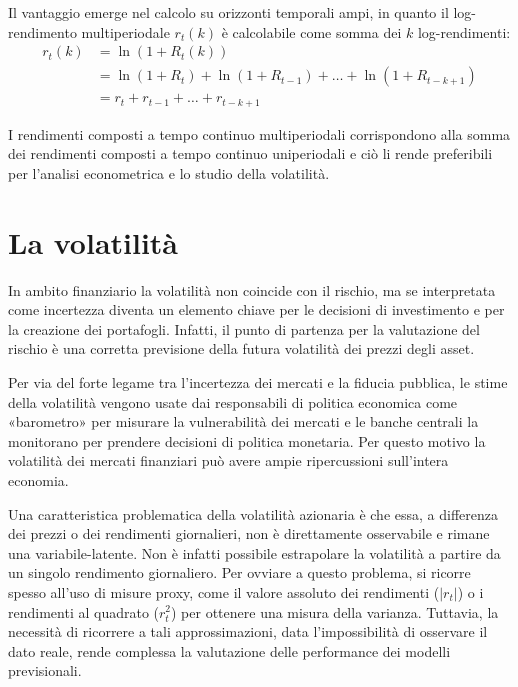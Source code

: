 Il vantaggio emerge nel calcolo su orizzonti temporali ampi, in quanto il log-rendimento multiperiodale $r_t(k)$ è calcolabile come somma dei $k$ log-rendimenti:
\begin{align*}
    r_t(k) &= \ln(1 + R_t(k)) \\
           &= \ln(1 + R_t) + \ln(1 + R_{t-1}) + \dots + \ln(1 + R_{t-k+1}) \\
           &= r_t + r_{t-1} + \dots + r_{t-k+1}
\end{align*}

I rendimenti composti a tempo continuo multiperiodali corrispondono alla somma dei rendimenti composti a tempo continuo uniperiodali e ciò li rende preferibili per l'analisi econometrica e lo studio della volatilità.


\section{La volatilità}
\label{sec:volatilita}
In ambito finanziario la volatilità non coincide con il rischio, ma se interpretata come incertezza diventa un elemento chiave per le decisioni 
di investimento e per la creazione dei portafogli\cite{poon:forecasting}. Infatti, il punto di partenza per la valutazione del rischio 
è una corretta previsione della futura volatilità dei prezzi degli asset.

Per via del forte legame tra l'incertezza dei mercati e la fiducia pubblica, le stime della volatilità vengono usate dai responsabili di 
politica economica come «barometro» per misurare la vulnerabilità dei mercati e le banche centrali la monitorano per prendere decisioni 
di politica monetaria. Per questo motivo la volatilità dei mercati finanziari può avere ampie ripercussioni sull'intera economia.

Una caratteristica problematica della volatilità azionaria è che essa, a differenza dei prezzi o dei rendimenti giornalieri, non è direttamente osservabile e rimane una \gls{variabile-latente}\cite{tsay:analysis}.
Non è infatti possibile estrapolare la volatilità a partire da un singolo rendimento giornaliero.
Per ovviare a questo problema, si ricorre spesso all'uso di misure \gls{proxy}, come il valore assoluto dei rendimenti ($|r_t|$) o i rendimenti al quadrato ($r_t^2$) per ottenere una misura della varianza.
Tuttavia, la necessità di ricorrere a tali approssimazioni, data l'impossibilità di osservare il dato reale, rende complessa la valutazione delle performance dei modelli previsionali.

